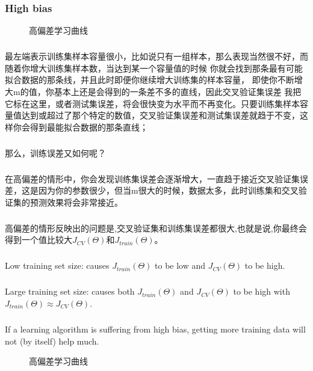 \documentclass{article}
\begin{document}
\begin{CJK}{UTF8}{gbsn}
\subsubsection{High bias}
\begin{figure}[H]
\label{fig:636}
\caption{高偏差学习曲线}
\end{figure}
\subparagraph{}
最左端表示训练集样本容量很小，比如说只有一组样本，那么表现当然很不好，而随着你增大训练集样本数，当达到某一个容量值的时候 你就会找到那条最有可能拟合数据的那条线，并且此时即便你继续增大训练集的样本容量， 即使你不断增大m的值，你基本上还是会得到的一条差不多的直线，因此交叉验证集误差 我把它标在这里，或者测试集误差，将会很快变为水平而不再变化。只要训练集样本容量值达到或超过了那个特定的数值，交叉验证集误差和测试集误差就趋于不变，这样你会得到最能拟合数据的那条直线；
\subparagraph{}
那么，训练误差又如何呢？
\subparagraph{}
在高偏差的情形中，你会发现训练集误差会逐渐增大，一直趋于接近交叉验证集误差，这是因为你的参数很少，但当m很大的时候，数据太多，此时训练集和交叉验证集的预测效果将会非常接近。
\subparagraph{}
高偏差的情形反映出的问题是,交叉验证集和训练集误差都很大,也就是说,你最终会得到一个值比较大$J_{CV}(\Theta)$和$J_{train}(\Theta)$。
\subparagraph{}
Low training set size: causes $J_{train}(\Theta)$ to be low and $J_{CV}(\Theta)$ to be high.
\subparagraph{}
Large training set size: causes both $J_{train}(\Theta)$ and $J_{CV}(\Theta)$ to be high with $J_{train}(\Theta)\approx{J_{CV}(\Theta)}$.
\subparagraph{}
If a learning algorithm is suffering from high bias, getting more training data will not (by itself) help much.
\begin{figure}[H]
\label{fig:640}
\caption{高偏差学习曲线}
\end{figure}

\end{CJK}
\end{document}
